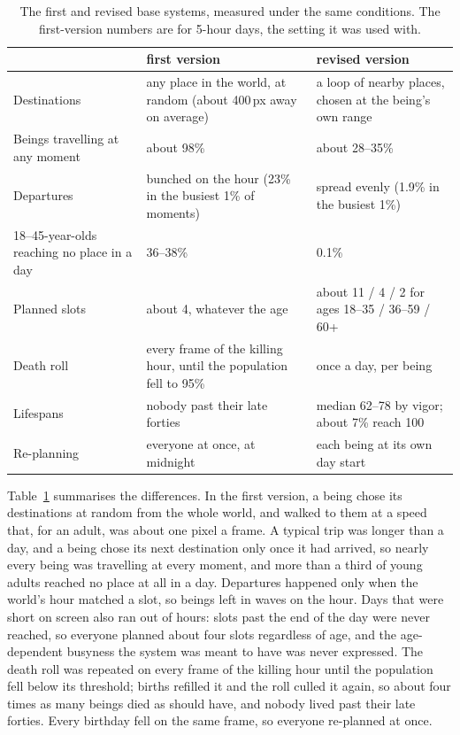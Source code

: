 \begin{table}[t]
  \centering
  \small
  \begin{tabularx}{\linewidth}{@{}l X X@{}}
    \toprule
    & \textbf{first version} & \textbf{revised version} \\
    \midrule
    Destinations & any place in the world, at random (about 400\,px away on average) & a loop of nearby places, chosen at the being's own range \\
    Beings travelling at any moment & about 98\% & about 28--35\% \\
    Departures & bunched on the hour (23\% in the busiest 1\% of moments) & spread evenly (1.9\% in the busiest 1\%) \\
    18--45-year-olds reaching no place in a day & 36--38\% & 0.1\% \\
    Planned slots & about 4, whatever the age & about 11 / 4 / 2 for ages 18--35 / 36--59 / 60+ \\
    Death roll & every frame of the killing hour, until the population fell to 95\% & once a day, per being \\
    Lifespans & nobody past their late forties & median 62--78 by vigor; about 7\% reach 100 \\
    Re-planning & everyone at once, at midnight & each being at its own day start \\
    \bottomrule
  \end{tabularx}
  \caption{The first and revised base systems, measured under the same conditions. The first-version numbers are for 5-hour days, the setting it was used with.}
  \label{tab:revision}
\end{table}

Table~\ref{tab:revision} summarises the differences. In the first version, a being chose its destinations at random from the whole world, and walked to them at a speed that, for an adult, was about one pixel a frame. A typical trip was longer than a day, and a being chose its next destination only once it had arrived, so nearly every being was travelling at every moment, and more than a third of young adults reached no place at all in a day. Departures happened only when the world's hour matched a slot, so beings left in waves on the hour. Days that were short on screen also ran out of hours: slots past the end of the day were never reached, so everyone planned about four slots regardless of age, and the age-dependent busyness the system was meant to have was never expressed. The death roll was repeated on every frame of the killing hour until the population fell below its threshold; births refilled it and the roll culled it again, so about four times as many beings died as should have, and nobody lived past their late forties. Every birthday fell on the same frame, so everyone re-planned at once.

